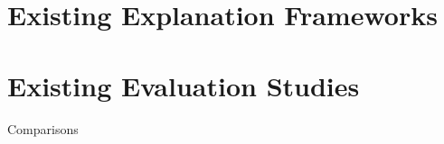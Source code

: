 \documentclass[main]{subfiles}
\begin{document}
\section{Existing Explanation Frameworks}






\section{Existing Evaluation Studies}

Comparisons

\end{document}
